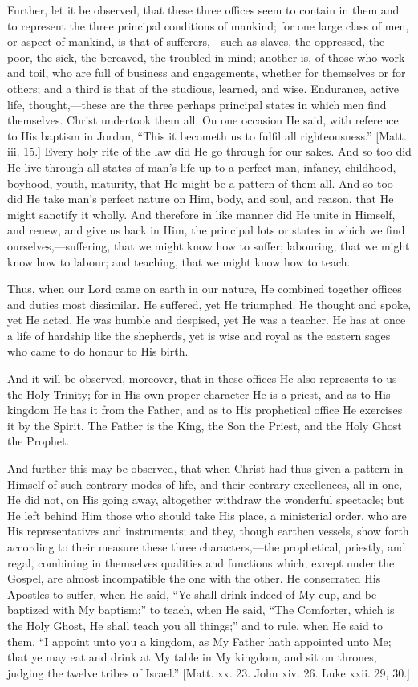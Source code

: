 Further, let it be observed, that these three offices seem to
contain in them and to represent the three principal conditions of
mankind; for one large class of men, or aspect of mankind, is that of
sufferers,—such as slaves, the oppressed, the poor, the sick, the
bereaved, the troubled in mind; another is, of those who work and
toil, who are full of business and engagements, whether for themselves
or for others; and a third is that of the studious, learned, and wise.
Endurance, active life, thought,—these are the three perhaps
principal states in which men find themselves. Christ undertook them
all. On one occasion He said, with reference to His baptism in Jordan,
``This it becometh us to fulfil all righteousness.'' [Matt.
iii. 15.] Every holy rite of the law did He go through for our sakes.
And so too did He live through all states of man's life up to a
perfect man, infancy, childhood, boyhood, youth, maturity, that He
might be a pattern of them all. And so too did He take man's perfect
nature on Him, body, and soul, and reason, that He might sanctify it
wholly. And therefore in like manner did He unite in Himself, and
renew, and give us back in Him, the principal lots or states in which
we find ourselves,—suffering, that we might know how to suffer;
labouring, that we might know how to labour; and teaching, that we
might know how to teach.

Thus, when our Lord came on earth in our nature, He combined
together offices and duties most dissimilar. He suffered, yet He
triumphed. He thought and spoke, yet He acted. He was humble and
despised, yet He was a teacher. He has at once a life of hardship like
the shepherds, yet is wise and royal as the eastern sages who came to
do honour to His birth.

And it will be observed, moreover, that in these offices He also
represents to us the Holy Trinity; for in His own proper character He
is a priest, and as to His kingdom He has it from the Father, and as
to His prophetical office He exercises it by the Spirit. The Father is
the King, the Son the Priest, and the Holy Ghost the Prophet.

And further this may be observed, that when Christ had thus given a
pattern in Himself of such contrary modes of life, and their contrary
excellences, all in one, He did not, on His going away, altogether
withdraw the wonderful spectacle; but He left behind Him those who
should take His place, a ministerial order, who are His
representatives and instruments; and they, though earthen vessels,
show forth according to their measure these three characters,—the
prophetical, priestly, and regal, combining in themselves qualities
and functions which, except under the Gospel, are almost incompatible
the one with the other. He consecrated His Apostles to suffer, when He
said, ``Ye shall drink indeed of My cup, and be baptized with My
baptism;'' to teach, when He said, ``The Comforter, which is
the Holy Ghost, He shall teach you all things;'' and to rule, when
He said to them, ``I appoint unto you a kingdom, as My Father hath
appointed unto Me; that ye may eat and drink at My table in My
kingdom, and sit on thrones, judging the twelve tribes of
Israel.'' [Matt. xx. 23. John xiv. 26. Luke xxii. 29, 30.]

